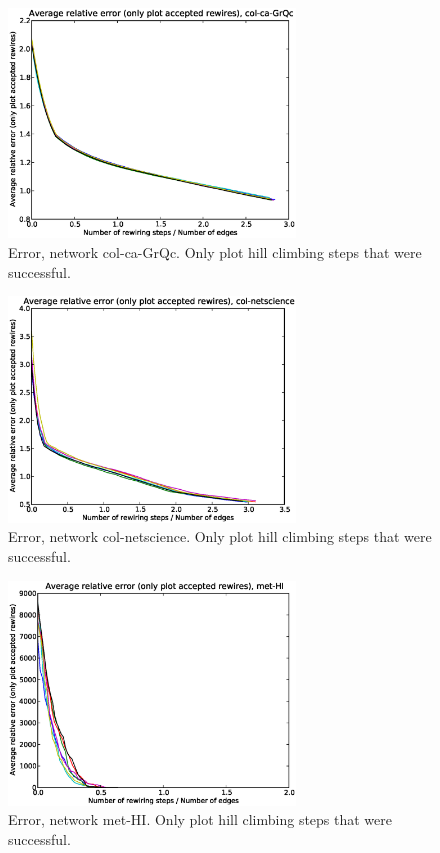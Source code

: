 \begin{figure}[p]
\centering
\includegraphics[width=3in]{Figures/acceptedOnly-col-ca-GrQc.eps}
\caption{Error, network col-ca-GrQc.  Only plot hill climbing steps that were successful.}
\label{fig:errors-col-ca-GrQc}
\end{figure}

\begin{figure}[p]
\centering
\includegraphics[width=3in]{Figures/acceptedOnly-col-netscience.eps}
\caption{Error, network col-netscience.  Only plot hill climbing steps that were successful.}
\label{fig:errors-col-netscience}
\end{figure}

\begin{figure}[p]
\centering
\includegraphics[width=3in]{Figures/acceptedOnly-met-HI.eps}
\caption{Error, network met-HI.  Only plot hill climbing steps that were successful.}
\label{fig:errors-met-HI}
\end{figure}


